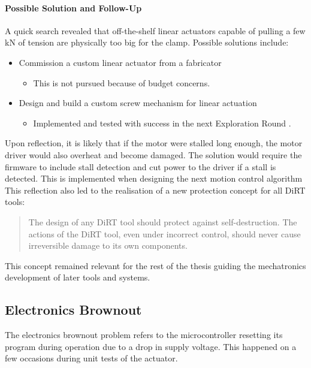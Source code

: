 \paragraph{Possible Solution and Follow-Up}

A quick search revealed that off-the-shelf linear actuators capable of pulling a few kN of tension are physically too big for the clamp. Possible solutions include:

\begin{itemize}[nosep]
    \item Commission a custom linear actuator from a fabricator
    \begin{itemize}
        \item This is not pursued because of budget concerns.
    \end{itemize}
    \item Design and build a custom screw mechanism for linear actuation
    \begin{itemize}
        \item Implemented and tested with success in the next Exploration Round .
    \end{itemize}
\end{itemize}

Upon reflection, it is likely that if the motor were stalled long enough, the motor driver would also overheat and become damaged. The solution would require the firmware to include stall detection and cut power to the driver if a stall is detected. This is implemented when designing the next motion control algorithm 
This reflection also led to the realisation of a new protection concept for all DiRT tools:
\begin{quote}
    The design of any DiRT tool should protect against self-destruction. The actions of the DiRT tool, even under incorrect control, should never cause irreversible damage to its own components.
\end{quote}
This concept remained relevant for the rest of the thesis guiding the mechatronics development of later tools and systems.

\subsection{Electronics Brownout}
\label{subsection:exploration-1-electronics-brownout}

The electronics brownout problem refers to the microcontroller resetting its program  during operation due to a drop in supply voltage. This happened on a few occasions during unit tests of the actuator.

